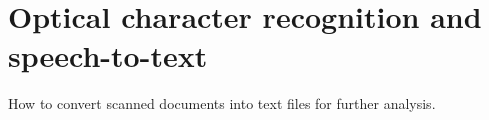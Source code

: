 \section{Optical character recognition and speech-to-text}
\label{sec:ocr}

How to convert scanned documents into text files for further analysis. 